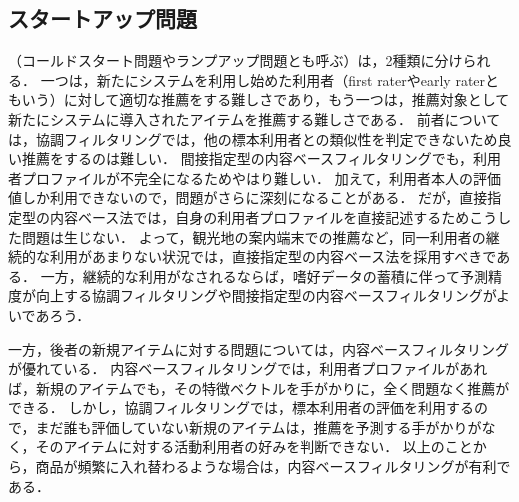 %

\subsection{スタートアップ問題}

（コールドスタート問題やランプアップ問題とも呼ぶ）は，2種類に分けられる．
一つは，新たにシステムを利用し始めた利用者（first raterやearly raterともいう）に対して適切な推薦をする難しさであり，もう一つは，推薦対象として新たにシステムに導入されたアイテムを推薦する難しさである．
前者については，協調フィルタリングでは，他の標本利用者との類似性を判定できないため良い推薦をするのは難しい．
間接指定型の内容ベースフィルタリングでも，利用者プロファイルが不完全になるためやはり難しい．
加えて，利用者本人の評価値しか利用できないので，問題がさらに深刻になることがある．
だが，直接指定型の内容ベース法では，自身の利用者プロファイルを直接記述するためこうした問題は生じない．
よって，観光地の案内端末での推薦など，同一利用者の継続的な利用があまりない状況では，直接指定型の内容ベース法を採用すべきである．
一方，継続的な利用がなされるならば，嗜好データの蓄積に伴って予測精度が向上する協調フィルタリングや間接指定型の内容ベースフィルタリングがよいであろう．

一方，後者の新規アイテムに対する問題については，内容ベースフィルタリングが優れている．
内容ベースフィルタリングでは，利用者プロファイルがあれば，新規のアイテムでも，その特徴ベクトルを手がかりに，全く問題なく推薦ができる．
しかし，協調フィルタリングでは，標本利用者の評価を利用するので，まだ誰も評価していない新規のアイテムは，推薦を予測する手がかりがなく，そのアイテムに対する活動利用者の好みを判断できない．
以上のことから，商品が頻繁に入れ替わるような場合は，内容ベースフィルタリングが有利である．

